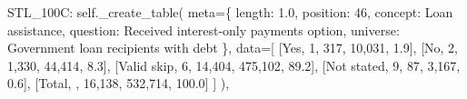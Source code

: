\documentclass[
  11pt,
  a4paper,
]{article}
\newenvironment{Shaded}{\begin{snugshade}}{\end{snugshade}}
\newcommand{\NormalTok}[1]{\textcolor[rgb]{0.00,0.23,0.31}{#1}}
\newcommand{\OperatorTok}[1]{\textcolor[rgb]{0.37,0.37,0.37}{#1}}
\newcommand{\StringTok}[1]{\textcolor[rgb]{0.13,0.47,0.30}{#1}}
\newcommand{\VariableTok}[1]{\textcolor[rgb]{0.07,0.07,0.07}{#1}}
\begin{document}
\begin{Shaded}
\begin{Highlighting}[]
            \StringTok{\textquotesingle{}STL\_100C\textquotesingle{}}\NormalTok{: }\VariableTok{self}\NormalTok{.\_create\_table(}
\NormalTok{                meta}\OperatorTok{=}\NormalTok{\{}
                \StringTok{\textquotesingle{}length\textquotesingle{}}\NormalTok{: }\StringTok{\textquotesingle{}1.0\textquotesingle{}}\NormalTok{, }\StringTok{\textquotesingle{}position\textquotesingle{}}\NormalTok{: }\StringTok{\textquotesingle{}46\textquotesingle{}}\NormalTok{,}
                \StringTok{\textquotesingle{}concept\textquotesingle{}}\NormalTok{: }\StringTok{\textquotesingle{}Loan assistance\textquotesingle{}}\NormalTok{,}
                \StringTok{\textquotesingle{}question\textquotesingle{}}\NormalTok{: }\StringTok{\textquotesingle{}Received interest{-}only payments option\textquotesingle{}}\NormalTok{,}
                \StringTok{\textquotesingle{}universe\textquotesingle{}}\NormalTok{: }\StringTok{\textquotesingle{}Government loan recipients with debt\textquotesingle{}}
\NormalTok{                \},}
\NormalTok{                data}\OperatorTok{=}\NormalTok{[}
\NormalTok{                [}\StringTok{\textquotesingle{}Yes\textquotesingle{}}\NormalTok{, }\StringTok{\textquotesingle{}1\textquotesingle{}}\NormalTok{, }\StringTok{\textquotesingle{}317\textquotesingle{}}\NormalTok{, }\StringTok{\textquotesingle{}10,031\textquotesingle{}}\NormalTok{, }\StringTok{\textquotesingle{}1.9\textquotesingle{}}\NormalTok{],}
\NormalTok{                [}\StringTok{\textquotesingle{}No\textquotesingle{}}\NormalTok{, }\StringTok{\textquotesingle{}2\textquotesingle{}}\NormalTok{, }\StringTok{\textquotesingle{}1,330\textquotesingle{}}\NormalTok{, }\StringTok{\textquotesingle{}44,414\textquotesingle{}}\NormalTok{, }\StringTok{\textquotesingle{}8.3\textquotesingle{}}\NormalTok{],}
\NormalTok{                [}\StringTok{\textquotesingle{}Valid skip\textquotesingle{}}\NormalTok{, }\StringTok{\textquotesingle{}6\textquotesingle{}}\NormalTok{, }\StringTok{\textquotesingle{}14,404\textquotesingle{}}\NormalTok{, }\StringTok{\textquotesingle{}475,102\textquotesingle{}}\NormalTok{, }\StringTok{\textquotesingle{}89.2\textquotesingle{}}\NormalTok{],}
\NormalTok{                [}\StringTok{\textquotesingle{}Not stated\textquotesingle{}}\NormalTok{, }\StringTok{\textquotesingle{}9\textquotesingle{}}\NormalTok{, }\StringTok{\textquotesingle{}87\textquotesingle{}}\NormalTok{, }\StringTok{\textquotesingle{}3,167\textquotesingle{}}\NormalTok{, }\StringTok{\textquotesingle{}0.6\textquotesingle{}}\NormalTok{],}
\NormalTok{                [}\StringTok{\textquotesingle{}Total\textquotesingle{}}\NormalTok{, }\StringTok{\textquotesingle{}\textquotesingle{}}\NormalTok{, }\StringTok{\textquotesingle{}16,138\textquotesingle{}}\NormalTok{, }\StringTok{\textquotesingle{}532,714\textquotesingle{}}\NormalTok{, }\StringTok{\textquotesingle{}100.0\textquotesingle{}}\NormalTok{]}
\NormalTok{                ]}
\NormalTok{            ),}
        

\end{Highlighting}
\end{Shaded}
\end{document}
